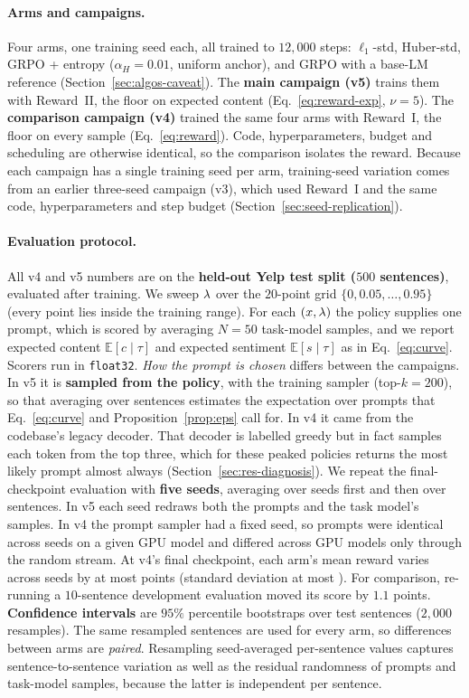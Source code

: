 \paragraph{Arms and campaigns.}
Four arms, one training seed each, all trained to $12{,}000$ steps:
\rrebel{} $\ell_1$-std, \rrebel{} Huber-std, GRPO + entropy
($\alpha_H = 0.01$, uniform anchor), and GRPO with a base-LM reference
(Section~\ref{sec:algos-caveat}). The \textbf{main campaign (v5)} trains them
with Reward~II, the floor on expected content (Eq.~\ref{eq:reward-exp}, $\nu =
5$). The \textbf{comparison campaign (v4)} trained the same four arms with
Reward~I, the floor on every sample (Eq.~\ref{eq:reward}). Code,
hyperparameters, budget and scheduling are otherwise identical, so the
comparison isolates the reward. Because each campaign has a single training
seed per arm, training-seed variation comes from an earlier three-seed campaign
(v3), which used Reward~I and the same code, hyperparameters and step budget
(Section~\ref{sec:seed-replication}).

\paragraph{Evaluation protocol.}
All v4 and v5 numbers are on the \textbf{held-out Yelp test split ($500$
sentences)}, evaluated after training. We sweep $\lambda$ over the $20$-point grid
$\{0, 0.05, \dots, 0.95\}$ (every point lies inside the training range). For
each $(x,\lambda)$ the policy supplies one prompt, which is scored by averaging
$N = 50$ task-model samples, and we report expected content
$\mathbb{E}[c\mid\tau]$ and expected sentiment $\mathbb{E}[s\mid\tau]$ as in
Eq.~\eqref{eq:curve}. Scorers run in \texttt{float32}.
\emph{How the prompt is chosen} differs between the campaigns. In v5 it is
\textbf{sampled from the policy}, with the training sampler (top-$k = 200$), so
that averaging over sentences estimates the expectation over prompts that
Eq.~\eqref{eq:curve} and Proposition~\ref{prop:eps} call for. In v4 it came
from the codebase's legacy decoder. That decoder is labelled greedy but in fact
samples each token from the top three, which for these peaked policies returns
the most likely prompt almost always (Section~\ref{sec:res-diagnosis}).
We repeat the final-checkpoint evaluation with \textbf{five seeds}, averaging
over seeds first and then over sentences. In v5 each seed redraws both the
prompts and the task model's samples. In v4 the prompt sampler had a fixed
seed, so prompts were identical across seeds on a given GPU model and differed
across GPU models only through the random stream. At v4's final checkpoint,
each arm's mean reward varies across seeds by at most \vSeedRangeMax{} points
(standard deviation at most \vSeedSDmax). For comparison, re-running a
$10$-sentence development evaluation moved its score by $1.1$ points.
\textbf{Confidence intervals} are $95\%$ percentile bootstraps over test
sentences ($2{,}000$ resamples). The same resampled sentences are used for
every arm, so differences between arms are \emph{paired}. Resampling
seed-averaged per-sentence values captures sentence-to-sentence variation as
well as the residual randomness of prompts and task-model samples, because the
latter is independent per sentence.

